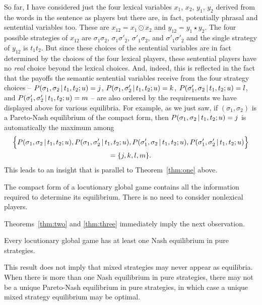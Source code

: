 So far, I have considered just the four lexical variables $x_1$, $x_2$, $y_1$, $y_2$ derived from the words in the sentence as players but there are, in fact, potentially phrasal and sentential variables too. These are $x_{12} = x_1 \odot x_2$ and $y_{12} = y_1 \star y_2$. The four possible strategies of $x_{12}$ are $\sigma_1\sigma_2$, $\sigma_1\sigma'_2$, $\sigma'_1\sigma_2$, and $\sigma'_1\sigma'_2$ and the single strategy of $y_{12}$ is $t_1t_2$. But since these choices of the sentential variables are in fact determined by the choices of the four lexical players, these sentential players have no \emph{real} choice beyond the lexical choices. And, indeed, this is reflected in the fact that the payoffs the semantic sentential variables receive from the four strategy choices -- $P(\sigma_1,\sigma_2 \,|\, t_1, t_2; u) = j$, $P(\sigma_1,\sigma'_2 \,|\, t_1, t_2; u) = k$, $P(\sigma'_1,\sigma_2 \,|\, t_1, t_2; u) = l$, and $P(\sigma'_1,\sigma'_2 \,|\, t_1, t_2; u) = m$ -- are also ordered by the requirements we have displayed above for various equilibria. For example, as we just saw, if $(\sigma_1, \sigma_2)$ is a Pareto-Nash equilibrium of the compact form, then $P(\sigma_1,\sigma_2 \,|\, t_1, t_2; u) = j$ is automatically the maximum among \begin{multline*}
    \Bigl\{P(\sigma_1,\sigma_2 \,|\, t_1, t_2; u), P(\sigma_1,\sigma'_2 \,|\, t_1, t_2; u), P(\sigma'_1,\sigma_2 \,|\, t_1, t_2; u), P(\sigma'_1,\sigma'_2 \,|\, t_1, t_2; u)\Bigr\} \\ = \{j, k, l, m\}\text{.}\end{multline*}
This leads to an insight that is parallel to Theorem~\ref{thm:one} above.

\begin{theorem} \label{thm:three}
The compact form of a locutionary global game contains all the information required to determine its equilibrium. There is no need to consider nonlexical players.
\end{theorem}

\noindent Theorems~\ref{thm:two} and \ref{thm:three} immediately imply the next observation.

\begin{theorem}
Every locutionary global game has at least one Nash equilibrium in pure strategies. \label{thm:existence of Nash}
\end{theorem}

\noindent This result does not imply that mixed strategies may never appear as equilibria. When there is more than one Nash equilibrium in pure strategies, there may not be a unique Pareto-Nash equilibrium in pure strategies, in which case a unique mixed strategy equilibrium may be optimal.

